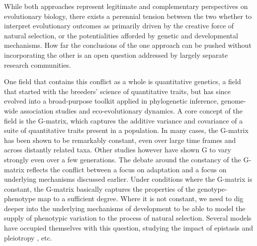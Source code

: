While both approaches represent legitimate and complementary perspectives on evolutionary biology, there exists a perennial tension between the two whether to interpret evolutionary outcomes as primarily driven by the creative force of natural selection, or the potentialities afforded by genetic and developmental mechanisms.
How far the conclusions of the one approach can be pushed without incorporating the other is an open question addressed by largely separate research communities.

One field that contains this conflict as a whole is quantitative genetics, a field that started with the breeders’ science of quantitative traits, but has since evolved into a broad-purpose toolkit applied in phylogenetic inference, genome-wide association studies and eco-evolutionary dynamics.
A core concept of the field is the G-matrix, which captures the additive variance and covariance of a suite of quantitative traits present in a population.
In many cases, the G-matrix has been shown to be remarkably constant, even over large time frames and across distantly related taxa.
Other studies however have shown G to vary strongly even over a few generations.
The debate around the constancy of the G-matrix reflects the conflict between a focus on adaptation and a focus on underlying mechanisms discussed earlier.
Under conditions where the G-matrix is constant, the G-matrix basically captures the properties of the genotype-phenotype map to a sufficient degree.
Where it is not constant, we need to dig deeper into the underlying mechanisms of development to be able to model the supply of phenotypic variation to the process of natural selection.
Several models have occupied themselves with this question, studying the impact of epistasis and pleiotropy \parencite{gjuvsland2007statistical, hether2014genetic, jiang2025alternative}, etc.

